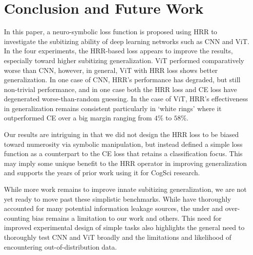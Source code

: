 \documentclass[letterpaper]{article} %
\begin{document}
\section{Conclusion and Future Work} \label{sec:conclusion}
In this paper, a neuro-symbolic loss function is proposed using HRR to investigate the subitizing ability of deep learning networks such as CNN and ViT. In the four experiments, the HRR-based loss appears to improve the results, especially toward higher subitizing generalization. ViT performed comparatively worse than CNN, however, in general, ViT with HRR loss shows better generalization. In one case of CNN, HRR’s performance has degraded, but still non-trivial performance, and in one case both the HRR loss and CE loss have degenerated worse-than-random guessing. In the case of ViT, HRR’s effectiveness in generalization remains consistent particularly in `white rings’ where it outperformed CE over a big margin ranging from $4\%$ to $58\%$.
\par
Our results are intriguing in that we did not design the HRR loss to be biased toward numerosity via symbolic manipulation, but instead defined a simple loss function as a counterpart to the CE loss that retains a classification focus. This may imply some unique benefit to the HRR operator in improving generalization and supports the years of prior work using it for CogSci research.
\par
While more work remains to improve innate subitizing generalization, we are not yet ready to move past these simplistic benchmarks. While \cite{b1} have thoroughly accounted for many potential information leakage sources, the under and over-counting bias remains a limitation to our work and others. This need for improved experimental design of simple tasks also highlights the general need to thoroughly test CNN and ViT broadly and the limitations and likelihood of encountering out-of-distribution data.
\end{document}
